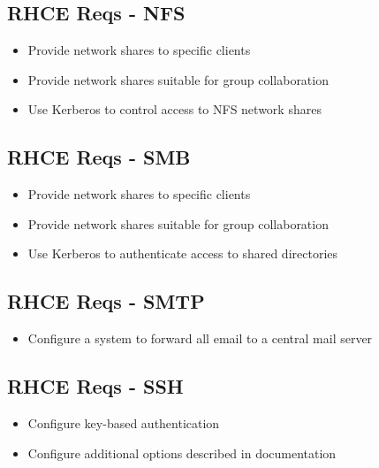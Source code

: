 \documentclass[letterpaper,10pt,english]{sphinxmanual}
\begin{document}
\subsection{RHCE Reqs - NFS}
\label{rhce:rhce-reqs-nfs}\begin{itemize}
\item {} 
Provide network shares to specific clients

\item {} 
Provide network shares suitable for group collaboration

\item {} 
Use Kerberos to control access to NFS network shares

\end{itemize}


\subsection{RHCE Reqs - SMB}
\label{rhce:rhce-reqs-smb}\begin{itemize}
\item {} 
Provide network shares to specific clients

\item {} 
Provide network shares suitable for group collaboration

\item {} 
Use Kerberos to authenticate access to shared directories

\end{itemize}


\subsection{RHCE Reqs - SMTP}
\label{rhce:rhce-reqs-smtp}\begin{itemize}
\item {} 
Configure a system to forward all email to a central mail server

\end{itemize}


\subsection{RHCE Reqs - SSH}
\label{rhce:rhce-reqs-ssh}\begin{itemize}
\item {} 
Configure key-based authentication

\item {} 
Configure additional options described in documentation

\end{itemize}
\end{document}

